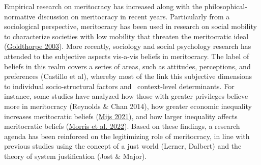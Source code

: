 \documentclass[
  letterpaper,
  DIV=11,
  numbers=noendperiod]{scrartcl}
\begin{document}
Empirical research on meritocracy has increased along with the
philosophical-normative discussion on meritocracy in recent years.
Particularly from a sociological perspective, meritocracy has been used
in research on social mobility to characterize societies with low
mobility that threaten the meritocratic ideal
(\protect\hyperlink{ref-goldthorpe_myth_2003}{Goldthorpe 2003}). More
recently, sociology and social psychology research has attended to the
subjective aspects vis-a-vis beliefs in meritocracy. The label of
beliefs in this realm covers a series of areas, such as attitudes,
perceptions, and preferences (Castillo et al), whereby most of the link
this subjective dimensions to individual socio-structural factors and~
context-level determinants. For instance, some studies have analyzed how
those with greater privileges believe more in meritocracy (Reynolds \&
Chan 2014), how greater economic inequality increases meritocratic
beliefs (\protect\hyperlink{ref-mijs_paradox_2021}{Mijs 2021}), and how
larger inequality affects meritocratic beliefs
(\protect\hyperlink{ref-morris_representing_2022}{Morris et al. 2022}).
Based on these findings, a research agenda has been reinforced on the
legitimizing role of meritocracy, in line with previous studies using
the concept of a just world (Lerner, Dalbert) and the theory of system
justification (Jost \& Major).
\end{document}
